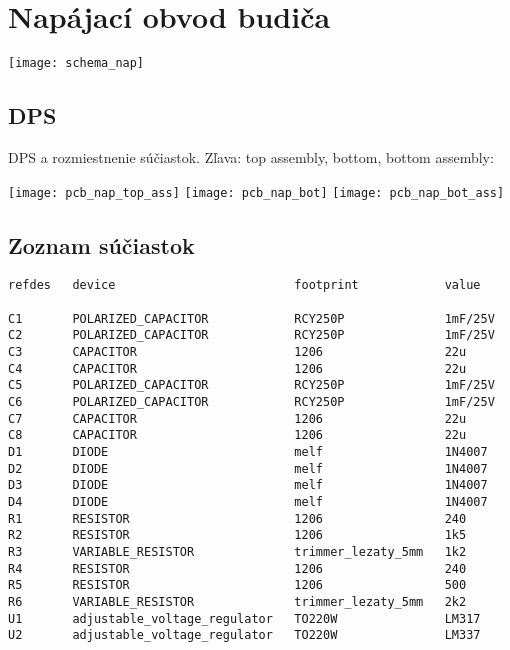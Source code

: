 \section{Napájací obvod budiča} \label{sec:append_nap}
\texttt{[image: schema\_nap]}

\subsection{DPS}
DPS a rozmiestnenie súčiastok. Zľava: top assembly, bottom, bottom assembly:\vspace{5pt}

\texttt{[image: pcb\_nap\_top\_ass]}
\texttt{[image: pcb\_nap\_bot]}
\texttt{[image: pcb\_nap\_bot\_ass]}

\newpage
\subsection{Zoznam súčiastok}
\small
\hspace{2cm}
\begin{verbatim}
refdes   device                         footprint            value    

C1       POLARIZED_CAPACITOR            RCY250P              1mF/25V
C2       POLARIZED_CAPACITOR            RCY250P              1mF/25V
C3       CAPACITOR                      1206                 22u      
C4       CAPACITOR                      1206                 22u      
C5       POLARIZED_CAPACITOR            RCY250P              1mF/25V
C6       POLARIZED_CAPACITOR            RCY250P              1mF/25V
C7       CAPACITOR                      1206                 22u      
C8       CAPACITOR                      1206                 22u      
D1       DIODE                          melf                 1N4007   
D2       DIODE                          melf                 1N4007   
D3       DIODE                          melf                 1N4007   
D4       DIODE                          melf                 1N4007   
R1       RESISTOR                       1206                 240      
R2       RESISTOR                       1206                 1k5      
R3       VARIABLE_RESISTOR              trimmer_lezaty_5mm   1k2      
R4       RESISTOR                       1206                 240      
R5       RESISTOR                       1206                 500      
R6       VARIABLE_RESISTOR              trimmer_lezaty_5mm   2k2      
U1       adjustable_voltage_regulator   TO220W               LM317    
U2       adjustable_voltage_regulator   TO220W               LM337    
\end{verbatim}
\normalsize




